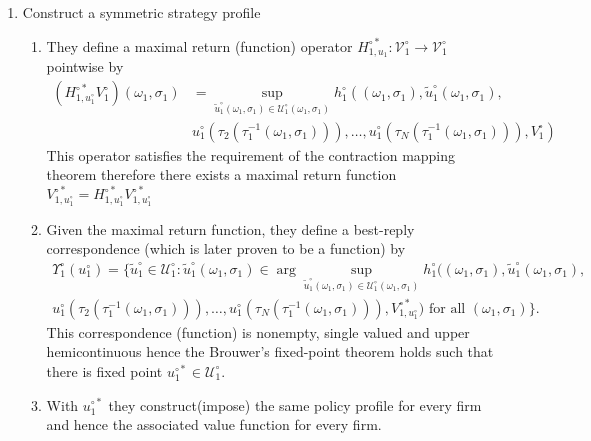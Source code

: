 \documentclass[12pt]{article}[margin=1in]
\begin{document}
\begin{enumerate}
    \item Construct a symmetric strategy profile
    \begin{enumerate}
        \item They define a maximal return (function) operator $H^{\circ *}_{1,u_1}:\mathcal{V}_1^\circ \to \mathcal{V}_1^\circ$ pointwise by 
        \begin{equation*}
            \begin{split}
                \left( H_{1, u_1^\circ}^{\circ *} V_1^\circ \right)(\omega_1, \sigma_1)& =
    \sup_{\tilde{u}_1^\circ (\omega_1, \sigma_1) \in \mathcal{U}_1^\circ (\omega_1, \sigma_1)}
    h_1^\circ \left( (\omega_1, \sigma_1), \tilde{u}_1^\circ (\omega_1, \sigma_1), \right.\\
    & \left. u_1^\circ (\tau_2 (\tau_1^{-1} (\omega_1, \sigma_1))), \dots, 
    u_1^\circ (\tau_N (\tau_1^{-1} (\omega_1, \sigma_1))), V_1^\circ \right)
            \end{split}
        \end{equation*}
     This operator satisfies the requirement of the contraction mapping theorem therefore there exists a maximal return function $V_{1, u_1^\circ}^{\circ *} = H_{1, u_1^\circ}^{\circ *} V_{1, u_1^\circ}^{\circ *}$
    \item Given the maximal return function, they define a best-reply correspondence (which is later proven to be a function) by 
    \begin{equation*}
        \begin{split}
        \Upsilon_1^\circ (u_1^\circ) = 
        \Bigg\{ \tilde{u}_1^\circ \in \mathcal{U}_1^\circ : 
        \tilde{u}_1^\circ (\omega_1, \sigma_1) \in  
        \arg \sup_{\tilde{u}_1^\circ (\omega_1, \sigma_1) \in \mathcal{U}_1^\circ (\omega_1, \sigma_1)}
        h_1^\circ \Big( (\omega_1, \sigma_1), \tilde{u}_1^\circ (\omega_1, \sigma_1), \\
        u_1^\circ (\tau_2 (\tau_1^{-1} (\omega_1, \sigma_1))), \dots, 
        u_1^\circ (\tau_N (\tau_1^{-1} (\omega_1, \sigma_1))), V_{1, u_1^\circ}^{\circ *} \Big)
        \text{ for all } (\omega_1, \sigma_1) \Bigg\}.
        \end{split}
        \end{equation*}        
This correspondence (function) is nonempty, single valued and upper hemicontinuous hence the Brouwer's fixed-point theorem holds such that there is fixed point $u_1^{\circ *}\in \mathcal{U}_1^\circ$. 
\item With $u_1^{\circ *}$ they construct(impose) the same policy profile for every firm and hence the associated value function for every firm. 
\end{enumerate}


\end{enumerate}
\end{document}
